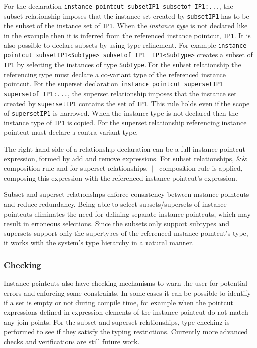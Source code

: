 \documentclass{llncs}
\begin{document}
For the declaration \lstinline!instance pointcut subsetIP1 subsetof IP1:...!, the subset relationship imposes that the instance set created by \texttt{subsetIP1} has to be the subset of the instance set of \texttt{IP1}. When the \emph{instance type} is not declared like in the example then it is inferred from the referenced instance pointcut, \texttt{IP1}. It is also possible to declare subsets by using type refinement. For example
\lstinline!instance pointcut subsetIP1<SubType> subsetof IP1: IP1<SubType>!
creates a subset of \texttt{IP1} by selecting the instances of type \texttt{SubType}. For the subset relationship the referencing type must declare a co-variant type of the referenced instance pointcut.
For the superset declaration \lstinline!instance pointcut supersetIP1 supersetof IP1:...!, the superset relationship imposes that the instance set created by \texttt{supersetIP1} contains the set of \texttt{IP1}. This rule holds even if the scope of \texttt{supersetIP1} is narrowed. When the instance type is not declared then the instance type of \texttt{IP1} is copied. For the superset relationship referencing instance pointcut must declare a contra-variant type.

The right-hand side of a relationship declaration can be a full instance pointcut expression, formed by add and remove expressions. For subset relationships, \&\& composition rule and for superset relationships, $\|$ composition rule is applied, composing this expression with the referenced instance pointcut's expression.

Subset and superset relationships enforce consistency between instance pointcuts and reduce redundancy. Being able to select subsets/supersets of instance pointcuts eliminates the need for defining separate instance pointcuts, which may result in erroneous selections. Since the subsets only support subtypes and supersets support only the supertypes of the referenced instance pointcut's type, it works with the system's type hierarchy in a natural manner. 

\subsubsection{Checking}
Instance pointcuts also have checking mechanisms to warn the user for potential errors and enforcing some constraints. In some cases it can be possible to identify if a set is empty or not during compile time, for example when the pointcut expressions defined in expression elements of the instance pointcut do not match any join points. For the subset and superset relationships, type checking is performed to see if they satisfy the typing restrictions. Currently more advanced checks and verifications are still future work.
\end{document}

